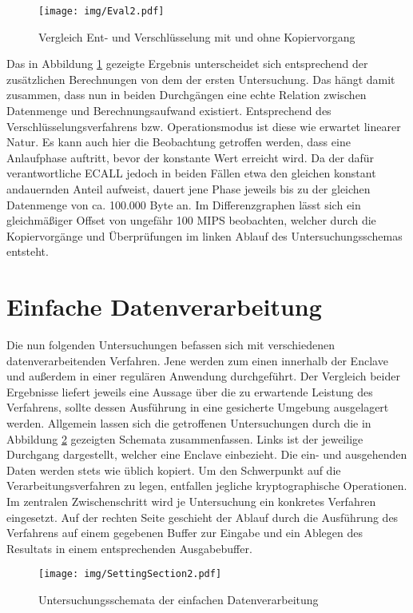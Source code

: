 \begin{figure}[h]
	\texttt{[image: img/Eval2.pdf]}
	\centering
	\caption{Vergleich Ent- und Verschlüsselung mit und ohne Kopiervorgang}
	\label{fig:eval2}
\end{figure}

Das in Abbildung \ref{fig:eval2} gezeigte Ergebnis unterscheidet sich entsprechend der zusätzlichen Berechnungen von dem der ersten Untersuchung. Das hängt damit zusammen, dass nun in beiden Durchgängen eine echte Relation zwischen Datenmenge und Berechnungsaufwand existiert. Entsprechend des Verschlüsselungsverfahrens bzw. Operationsmodus ist diese wie erwartet linearer Natur. Es kann auch hier die Beobachtung getroffen werden, dass eine Anlaufphase auftritt, bevor der konstante Wert erreicht wird. Da der dafür verantwortliche ECALL jedoch in beiden Fällen etwa den gleichen konstant andauernden Anteil aufweist, dauert jene Phase jeweils bis zu der gleichen Datenmenge von ca. 100.000 Byte an. Im Differenzgraphen lässt sich ein gleichmäßiger Offset von ungefähr 100 MIPS beobachten, welcher durch die Kopiervorgänge und Überprüfungen im linken Ablauf des Untersuchungsschemas entsteht.

\section{Einfache Datenverarbeitung}

Die nun folgenden Untersuchungen befassen sich mit verschiedenen datenverarbeitenden Verfahren. Jene werden zum einen innerhalb der Enclave und außerdem in einer regulären Anwendung durchgeführt. Der Vergleich beider Ergebnisse liefert jeweils eine Aussage über die zu erwartende Leistung des Verfahrens, sollte dessen Ausführung in eine gesicherte Umgebung ausgelagert werden. Allgemein lassen sich die getroffenen Untersuchungen durch die in Abbildung \ref{fig:settingsection2} gezeigten Schemata zusammenfassen. Links ist der jeweilige Durchgang dargestellt, welcher eine Enclave einbezieht. Die ein- und ausgehenden Daten werden stets wie üblich kopiert. Um den Schwerpunkt auf die Verarbeitungsverfahren zu legen, entfallen jegliche kryptographische Operationen. Im zentralen Zwischenschritt wird je Untersuchung ein konkretes Verfahren eingesetzt. Auf der rechten Seite geschieht der Ablauf durch die Ausführung des Verfahrens auf einem gegebenen Buffer zur Eingabe und ein Ablegen des Resultats in einem entsprechenden Ausgabebuffer.

\begin{figure}[h]
	\texttt{[image: img/SettingSection2.pdf]}
	\centering
	\caption{Untersuchungsschemata der einfachen Datenverarbeitung}
	\label{fig:settingsection2}
\end{figure}

